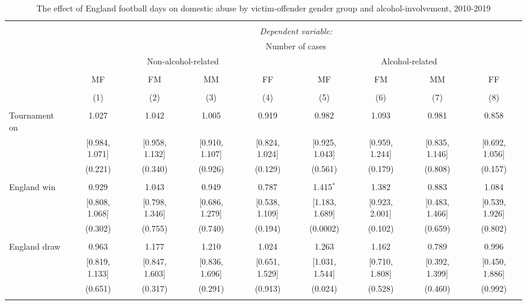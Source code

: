 \documentclass[12pt, a4paper]{article}
\begin{document}
\begin{table}
\centering
 \caption{The effect of England football days on domestic abuse by victim-offender gender group and alcohol-involvement, 2010-2019}
   \label{gender}
 \begin{threeparttable}
\begin{tabular}{@{\extracolsep{1pt}}lcccccccc}
\\[-1.8ex]\hline
\hline \\[-1.8ex]
 & \multicolumn{8}{c}{\textit{Dependent variable:}} \\
   & \multicolumn{8}{c}{Number of cases} \\
  & \multicolumn{4}{c}{Non-alcohol-related} &\multicolumn{4}{c}{Alcohol-related} \\
\cline{2-9}
\\[-1.8ex] & MF & FM & MM & FF & MF & FM & MM & FF \\
\\[-1.8ex] & (1) & (2) & (3) & (4) & (5) & (6) & (7) & (8)\\
\hline \\[-1.8ex]
 Tournament on & 1.027 & 1.042 & 1.005 & 0.919 & 0.982 & 1.093 & 0.981 & 0.858 \\
  & [0.984, 1.071] & [0.958, 1.132] & [0.910, 1.107] & [0.824, 1.024] & [0.925, 1.043] & [0.959, 1.244] & [0.835, 1.146] & [0.692, 1.056] \\
  & (0.221) & (0.340) & (0.926) & (0.129) & (0.561) & (0.179) & (0.808) & (0.157) \\
  & & & & & & & & \\
 England win & 0.929 & 1.043 & 0.949 & 0.787 & 1.415$^{*}$ & 1.382 & 0.883 & 1.084 \\
  & [0.808, 1.068] & [0.798, 1.346] & [0.686, 1.279] & [0.538, 1.109] & [1.183, 1.689] & [0.923, 2.001] & [0.483, 1.466] & [0.539, 1.926] \\
  & (0.302) & (0.755) & (0.740) & (0.194) & (0.0002) & (0.102) & (0.659) & (0.802) \\
  & & & & & & & & \\
 England draw & 0.963 & 1.177 & 1.210 & 1.024 & 1.263 & 1.162 & 0.789 & 0.996 \\
  & [0.819, 1.133] & [0.847, 1.603] & [0.836, 1.696] & [0.651, 1.529] & [1.031, 1.544] & [0.710, 1.808] & [0.392, 1.399] & [0.450, 1.886] \\
  & (0.651) & (0.317) & (0.291) & (0.913) & (0.024) & (0.528) & (0.460) & (0.992) \\
  & & & & & & & & \\

\end{tabular}
\end{threeparttable}
\end{table}
\end{document}
